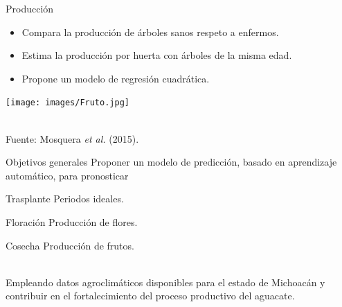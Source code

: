 \documentclass[aspectratio=169]{beamer}
\begin{document}
\begin{frame}{Producción}
    
    \vspace{-1cm}
		\begin{minipage}{0.5\textwidth}
            \begin{block}{}
                \begin{itemize}
				\item Compara la producción de árboles sanos respeto a enfermos.
                    \item Estima la producción por huerta con árboles de la misma edad.
                    \item Propone un modelo de regresión cuadrática. 
			\end{itemize}
            \end{block}
		\end{minipage}%
        \begin{minipage}{0.5\textwidth}
        \centering
\texttt{[image: images/Fruto.jpg]}
		\end{minipage}%
        \,\\
        \hfill {\scriptsize Fuente: Mosquera \textit{et al.} (2015).}
\end{frame}

\begin{frame}{Objetivos generales}
    Proponer un modelo de predicción, basado en aprendizaje automático, para pronosticar

    \begin{minipage}{0.33\textwidth}
        \pause\begin{block}{Trasplante}
            Periodos ideales.
        \end{block}
    \end{minipage}%
    \begin{minipage}{0.34\textwidth}\pause\begin{block}{Floración \phantom{p}}
            Producción de flores.
        \end{block}%
    \end{minipage}%
    \begin{minipage}{0.33\textwidth}
        \pause\begin{block}{Cosecha \phantom{p}}
            Producción de frutos.
        \end{block}
    \end{minipage}
    
\,\\
   \pause
   Empleando datos agroclimáticos disponibles para el estado de Michoacán y contribuir en el fortalecimiento del proceso productivo del aguacate.
\end{frame}
\end{document}
